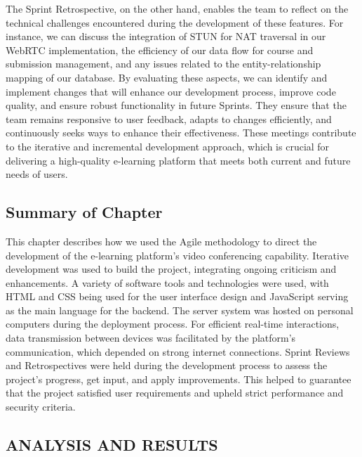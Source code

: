 \documentclass[a4paper,12pt]{article}  %
\begin{document}
The Sprint Retrospective, on the other hand, enables the team to reflect on the technical challenges encountered during the development of these features. For instance, we can discuss the integration of STUN for NAT traversal in our WebRTC implementation, the efficiency of our data flow for course and submission management, and any issues related to the entity-relationship mapping of our database. By evaluating these aspects, we can identify and implement changes that will enhance our development process, improve code quality, and ensure robust functionality in future Sprints. They ensure that the team remains responsive to user feedback, adapts to changes efficiently, and continuously seeks ways to enhance their effectiveness. These meetings contribute to the iterative and incremental development approach, which is crucial for delivering a high-quality e-learning platform that meets both current and future needs of users.

\subsection{Summary of Chapter}
This chapter describes how we used the Agile methodology to direct the development of the e-learning platform's video conferencing capability. Iterative development was used to build the project, integrating ongoing criticism and enhancements. A variety of software tools and technologies were used, with HTML and CSS being used for the user interface design and JavaScript serving as the main language for the backend. The server system was hosted on personal computers during the deployment process. For efficient real-time interactions, data transmission between devices was facilitated by the platform's communication, which depended on strong internet connections. Sprint Reviews and Retrospectives were held during the development process to assess the project's progress, get input, and apply improvements. This helped to guarantee that the project satisfied user requirements and upheld strict performance and security criteria.\\ \newpage

\begin{center}
      \section{ANALYSIS AND RESULTS}
\end{center}
\end{document}
